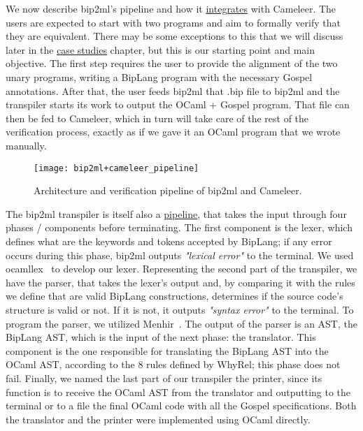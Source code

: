 We now describe bip2ml's pipeline and how it \hyperref[fig:bip2ml_cameleer_pipeline]{integrates} with Cameleer.
The users are expected to start with two programs and aim to formally verify that they are equivalent.
There may be some exceptions to this that we will discuss later in the \hyperref[cha:case_studies]{case studies} chapter, but this is our starting point and main objective.
The first step requires the user to provide the alignment of the two unary programs, writing a BipLang program with the necessary Gospel annotations.
After that, the user feeds bip2ml that .bip file to bip2ml and the transpiler starts its work to output the OCaml + Gospel program.
That file can then be fed to Cameleer, which in turn will take care of the rest of the verification process, exactly as if we gave it an OCaml program that we wrote manually.

\begin{figure}[htbp]
  \centering
  \texttt{[image: bip2ml+cameleer\_pipeline]}
  \caption{Architecture and verification pipeline of bip2ml and Cameleer.}
  \label{fig:bip2ml_cameleer_pipeline}
\end{figure}

The bip2ml transpiler is itself also a \hyperref[fig:bip2ml_cameleer_pipeline]{pipeline}, that takes the input through four phases / components before terminating.
The first component is the lexer, which defines what are the keywords and tokens accepted by BipLang; if any error occurs during this phase, bip2ml outputs \emph{"lexical error"} to the terminal.
We used ocamllex~\cite{ocamllex} to develop our lexer.
Representing the second part of the transpiler, we have the parser, that takes the lexer's output and, by comparing it with the rules we define that are valid BipLang constructions, determines if the source code's structure is valid or not.
If it is not, it outputs \emph{"syntax error"} to the terminal.
To program the parser, we utilized Menhir~\cite{menhir}.
The output of the parser is an AST, the BipLang AST, which is the input of the next phase: the translator.
This component is the one responsible for translating the BipLang AST into the OCaml AST, according to the 8 rules defined by WhyRel; this phase does not fail.
Finally, we named the last part of our transpiler the printer, since its function is to receive the OCaml AST from the translator and outputting to the terminal or to a file the final OCaml code with all the Gospel specifications.
Both the translator and the printer were implemented using OCaml directly.

